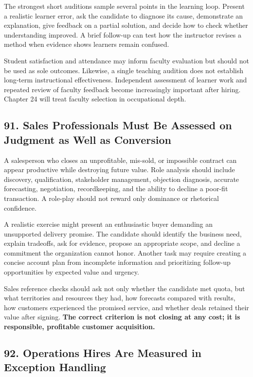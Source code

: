 The strongest short auditions sample several points in the learning loop. Present a realistic learner error, ask the candidate to diagnose its cause, demonstrate an explanation, give feedback on a partial solution, and decide how to check whether understanding improved. A brief follow-up can test how the instructor revises a method when evidence shows learners remain confused.

Student satisfaction and attendance may inform faculty evaluation but should not be used as sole outcomes. Likewise, a single teaching audition does not establish long-term instructional effectiveness. Independent assessment of learner work and repeated review of faculty feedback become increasingly important after hiring. Chapter 24 will treat faculty selection in occupational depth.

\subsection*{91. Sales Professionals Must Be Assessed on Judgment as Well as Conversion}

A salesperson who closes an unprofitable, mis-sold, or impossible contract can appear productive while destroying future value. Role analysis should include discovery, qualification, stakeholder management, objection diagnosis, accurate forecasting, negotiation, recordkeeping, and the ability to decline a poor-fit transaction. A role-play should not reward only dominance or rhetorical confidence.

A realistic exercise might present an enthusiastic buyer demanding an unsupported delivery promise. The candidate should identify the business need, explain tradeoffs, ask for evidence, propose an appropriate scope, and decline a commitment the organization cannot honor. Another task may require creating a concise account plan from incomplete information and prioritizing follow-up opportunities by expected value and urgency.

Sales reference checks should ask not only whether the candidate met quota, but what territories and resources they had, how forecasts compared with results, how customers experienced the promised service, and whether deals retained their value after signing. \textbf{The correct criterion is not closing at any cost; it is responsible, profitable customer acquisition.}

\subsection*{92. Operations Hires Are Measured in Exception Handling}

